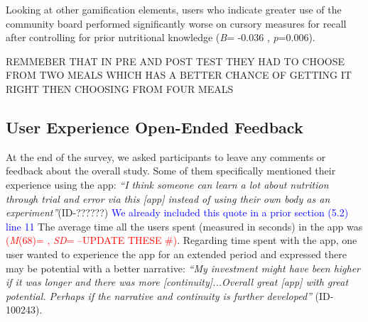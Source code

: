 Looking at other gamification elements, users who indicate greater use of the community board performed significantly worse on cursory measures for recall after controlling for prior nutritional knowledge (\textit{B}= -0.036 , \textit{p}=0.006).


REMMEBER THAT IN PRE AND POST TEST THEY HAD TO CHOOSE FROM TWO MEALS WHICH HAS A BETTER CHANCE OF GETTING IT RIGHT THEN CHOOSING FROM FOUR MEALS





\vspace{-5pt}
\subsection{User Experience Open-Ended Feedback}
At the end of the survey, we asked participants to leave any comments or feedback about the overall study. 
Some of them specifically mentioned their experience using the app: \textit{``I think someone can learn a lot about nutrition through trial and error via this [app] instead of using their own body as an experiment''}(ID-??????)
\textcolor{blue}{We already included this quote in a prior section (5.2) line 11}
The average time all the users spent (measured in seconds) in the app was \textcolor{red}{(\textit{M}(68)= , \textit{SD}= --UPDATE THESE \#)}. 
Regarding time spent with the app, one user wanted to experience the app for an extended period and expressed there may be potential with a better narrative: \textit{``My investment might have been higher if it was longer and there was more [continuity]...Overall great [app] with great potential. Perhaps if the narrative and continuity is further developed''} (ID-100243). %


